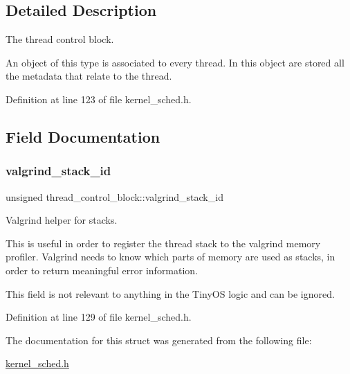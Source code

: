 \subsection{Detailed Description}
The thread control block. 

An object of this type is associated to every thread. In this object are stored all the metadata that relate to the thread. 

Definition at line 123 of file kernel\+\_\+sched.\+h.



\subsection{Field Documentation}
\mbox{\label{structthread__control__block_ad8a2da36c0ad775c12c5f66f4fec9d41}} 
\subsubsection{\texorpdfstring{valgrind\+\_\+stack\+\_\+id}{valgrind\_stack\_id}}
{\footnotesize\ttfamily unsigned thread\+\_\+control\+\_\+block\+::valgrind\+\_\+stack\+\_\+id}



Valgrind helper for stacks. 

This is useful in order to register the thread stack to the valgrind memory profiler. Valgrind needs to know which parts of memory are used as stacks, in order to return meaningful error information.

This field is not relevant to anything in the Tiny\+OS logic and can be ignored. 

Definition at line 129 of file kernel\+\_\+sched.\+h.



The documentation for this struct was generated from the following file\+:\begin{DoxyCompactItemize}
\item 
\hyperlink{kernel__sched_8h}{kernel\+\_\+sched.\+h}\end{DoxyCompactItemize}
